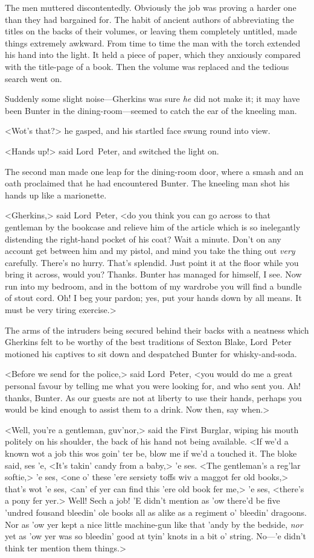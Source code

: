 The men muttered discontentedly. Obviously the job was proving a harder one than they had bargained for. The habit of ancient authors of abbreviating the titles on the backs of their volumes, or leaving them completely untitled, made things extremely awkward. From time to time the man with the torch extended his hand into the light. It held a piece of paper, which they anxiously compared with the title-page of a book. Then the volume was replaced and the tedious search went on.

Suddenly some slight noise—Gherkins was sure \emph{he} did not make it; it may have been Bunter in the dining-room—seemed to catch the ear of the kneeling man.

<Wot's that?> he gasped, and his startled face swung round into view.

<Hands up!> said Lord~Peter, and switched the light on.

The second man made one leap for the dining-room door, where a smash and an oath proclaimed that he had encountered Bunter. The kneeling man shot his hands up like a marionette.

<Gherkins,> said Lord~Peter, <do you think you can go across to that gentleman by the bookcase and relieve him of the article which is so inelegantly distending the right-hand pocket of his coat? Wait a minute. Don't on any account get between him and my pistol, and mind you take the thing out \emph{very} carefully. There's no hurry. That's splendid. Just point it at the floor while you bring it across, would you? Thanks. Bunter has managed for himself, I see. Now run into my bedroom, and in the bottom of my wardrobe you will find a bundle of stout cord. Oh! I beg your pardon; yes, put your hands down by all means. It must be very tiring exercise.>

The arms of the intruders being secured behind their backs with a neatness which Gherkins felt to be worthy of the best traditions of Sexton Blake, Lord~Peter motioned his captives to sit down and despatched Bunter for whisky-and-soda.

<Before we send for the police,> said Lord~Peter, <you would do me a great personal favour by telling me what you were looking for, and who sent you. Ah! thanks, Bunter. As our guests are not at liberty to use their hands, perhaps you would be kind enough to assist them to a drink. Now then, say when.>

<Well, you're a gentleman, guv'nor,> said the First Burglar, wiping his mouth politely on his shoulder, the back of his hand not being available. <If we'd a known wot a job this wos goin' ter be, blow me if we'd a touched it. The bloke said, ses 'e, <It's takin' candy from a baby,> 'e ses. <The gentleman's a reg'lar softie,> 'e ses, <one o' these 'ere sersiety toffs wiv a maggot fer old books,> that's wot 'e ses, <an' ef yer can find this 'ere old book fer me,> 'e ses, <there's a pony fer yer.> Well! Sech a job! 'E didn't mention as 'ow there'd be five 'undred fousand bleedin' ole books all as alike as a regiment o' bleedin' dragoons. Nor as 'ow yer kept a nice little machine-gun like that 'andy by the bedside, \emph{nor} yet as 'ow yer was so bleedin' good at tyin' knots in a bit o' string. No—'e didn't think ter mention them things.>

